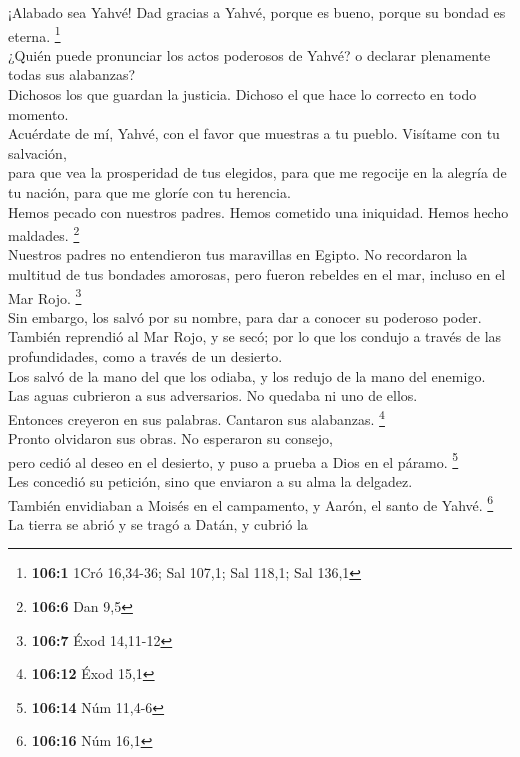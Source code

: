  ¡Alabado sea Yahvé! Dad gracias a Yahvé, porque es bueno,
porque su bondad es eterna. \footnote{\textbf{106:1} 1Cró 16,34-36; Sal
  107,1; Sal 118,1; Sal 136,1}\\
 ¿Quién puede pronunciar los actos poderosos de Yahvé? o
declarar plenamente todas sus alabanzas?\\
 Dichosos los que guardan la justicia. Dichoso el que hace
lo correcto en todo momento.\\
 Acuérdate de mí, Yahvé, con el favor que muestras a tu
pueblo. Visítame con tu salvación,\\
 para que vea la prosperidad de tus elegidos, para que me
regocije en la alegría de tu nación, para que me gloríe con tu
herencia.\\
 Hemos pecado con nuestros padres. Hemos cometido una
iniquidad. Hemos hecho maldades. \footnote{\textbf{106:6} Dan 9,5}\\
 Nuestros padres no entendieron tus maravillas en Egipto.
No recordaron la multitud de tus bondades amorosas, pero fueron rebeldes
en el mar, incluso en el Mar Rojo. \footnote{\textbf{106:7} Éxod
  14,11-12}\\
 Sin embargo, los salvó por su nombre, para dar a conocer
su poderoso poder.\\
 También reprendió al Mar Rojo, y se secó; por lo que los
condujo a través de las profundidades, como a través de un desierto.\\
 Los salvó de la mano del que los odiaba, y los redujo de
la mano del enemigo.\\
 Las aguas cubrieron a sus adversarios. No quedaba ni uno
de ellos.\\
 Entonces creyeron en sus palabras. Cantaron sus
alabanzas. \footnote{\textbf{106:12} Éxod 15,1}\\
 Pronto olvidaron sus obras. No esperaron su consejo,\\
 pero cedió al deseo en el desierto, y puso a prueba a
Dios en el páramo. \footnote{\textbf{106:14} Núm 11,4-6}\\
 Les concedió su petición, sino que enviaron a su alma la
delgadez.\\
 También envidiaban a Moisés en el campamento, y Aarón,
el santo de Yahvé. \footnote{\textbf{106:16} Núm 16,1}\\
 La tierra se abrió y se tragó a Datán, y cubrió la

